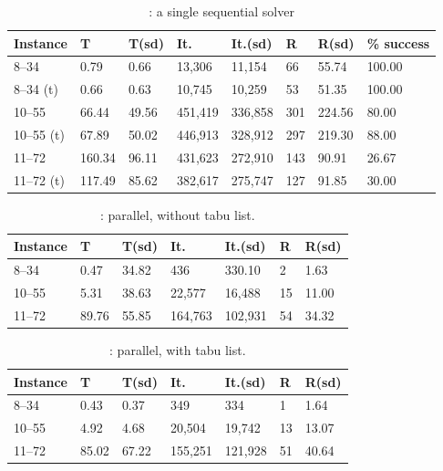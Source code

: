 \begin{table}
	\captionsetup{belowskip=6pt,aboveskip=6pt}
	\centering 
	\renewcommand{\arraystretch}{1}
		\begin{tabular}{p{2cm}|R{1.2cm}R{1.2cm}|R{1.5cm}R{1.5cm}|R{0.8cm}R{1.2cm}|R{1.5cm}}
			\hline 	
			{\bf Instance} & T & T(sd) & It. & It.(sd) & R & R(sd) & \% success\\
			\hline
			8--34 & 0.79 & 0.66 & 13,306 & 11,154 & 66 & 55.74 & 100.00\\
			8--34 (t) & 0.66 & 0.63 & 10,745 & 10,259 & 53 & 51.35 & 100.00 \\
			10--55 & 66.44 & 49.56 & 451,419 & 336,858 & 301 & 224.56 & 80.00\\			
			10--55 (t) & 67.89 & 50.02 & 446,913 & 328,912 & 297 & 219.30 & 88.00\\
			11--72 & 160.34 & 96.11 & 431,623 & 272,910 & 143 & 90.91 & 26.67\\
			11--72 (t) & 117.49 & 85.62 & 382,617 & 275,747 & 127 & 91.85 & 30.00\\
			\hline
		\end{tabular}
	\caption{\gr: a single sequential solver}
	\label{tab:golomb_sec}
\end{table}

\begin{table}
	\captionsetup{belowskip=6pt,aboveskip=6pt}
	\centering 
	\renewcommand{\arraystretch}{1}
	\begin{tabular}{p{2cm}|R{1.2cm}R{1.2cm}|R{1.5cm}R{1.5cm}|R{0.8cm}R{1.2cm}}
		\hline 	
		{\bf Instance} & T & T(sd) & It. & It.(sd) & R & R(sd)\\
		\hline
		8--34 & 0.47 & 34.82 & 436 & 330.10 & 2 & 1.63\\
		10--55 & 5.31 & 38.63 & 22,577 & 16,488 & 15 & 11.00\\
		11--72 & 89.76 & 55.85 & 164,763 & 102,931 & 54 & 34.32\\
		\hline
	\end{tabular}
	\caption{\gr: parallel, without tabu list.}
	\label{tab:golomb_par_notabu}
\end{table}

\begin{table}
	\captionsetup{belowskip=6pt,aboveskip=6pt}
	\centering 
	\renewcommand{\arraystretch}{1}
	\begin{tabular}{p{2cm}|R{1.2cm}R{1.2cm}|R{1.5cm}R{1.5cm}|R{0.8cm}R{1.2cm}}
		\hline 	
		{\bf Instance} & T & T(sd) & It. & It.(sd) & R & R(sd)\\
		\hline
		8--34 & 0.43 & 0.37 & 349 & 334 & 1 & 1.64\\
		10--55 & 4.92 & 4.68 & 20,504 & 19,742 & 13 & 13.07\\
		11--72 & 85.02 & 67.22 & 155,251 & 121,928 & 51 & 40.64\\
		\hline
	\end{tabular}
	\caption{\gr: parallel, with tabu list.}
	\label{tab:golomb_par_tabu}
\end{table}

